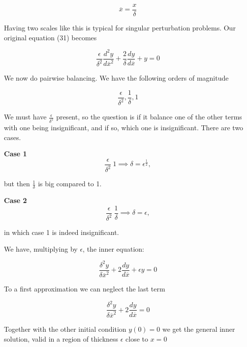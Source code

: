 \documentclass[12pt]{article}
\begin{document}
\begin{equation}
\overline{x} = \frac{x}{\delta}
\end{equation}

Having two scales like this is typical for singular perturbation problems. Our
original equation (31) becomes

\begin{equation}
\frac{\epsilon}{\delta^2} \frac{d^2y}{d\overline{x}^2} + \frac{2}{\delta}
\frac{dy}{d\overline{x}} + y = 0
\end{equation}

We now do pairwise balancing. We have the following orders of
magnitude

\begin{equation}
\frac{\epsilon}{\delta^2}, \frac{1}{\delta}, 1
\end{equation}

We must have $\frac{\epsilon}{\delta^2}$ present, so the question is if it
balance one of the other terms with one being insignificant, and if so, which one
is insignificant. There are two cases.

\textbf{Case 1}
\begin{equation}
\frac{\epsilon}{\delta^2} ~ 1 \implies \delta = \epsilon^{\frac{1}{2}},
\end{equation}

but then $\frac{1}{\delta}$ is big compared to 1.

\textbf{Case 2}
\begin{equation}
\frac{\epsilon}{\delta^2} ~ \frac{1}{\delta} \implies \delta = \epsilon,
\end{equation}

in which case 1 is indeed insignificant.

We have, multiplying by $\epsilon$, the inner equation:

\begin{equation}
\frac{\delta^2 y}{\delta \overline{x}^2} + 2 \frac{dy}{d\overline{x}} + \epsilon
y = 0
\end{equation}

To a first approximation we can neglect the last term

\begin{equation}
\frac{\delta^2 y}{\delta \overline{x}^2} + 2 \frac{dy}{d\overline{x}} = 0
\end{equation}

Together with the other initial condition $y(0)=0$ we get the general inner
solution, valid in a region of thickness $\epsilon$ close to $x=0$
\end{document}
